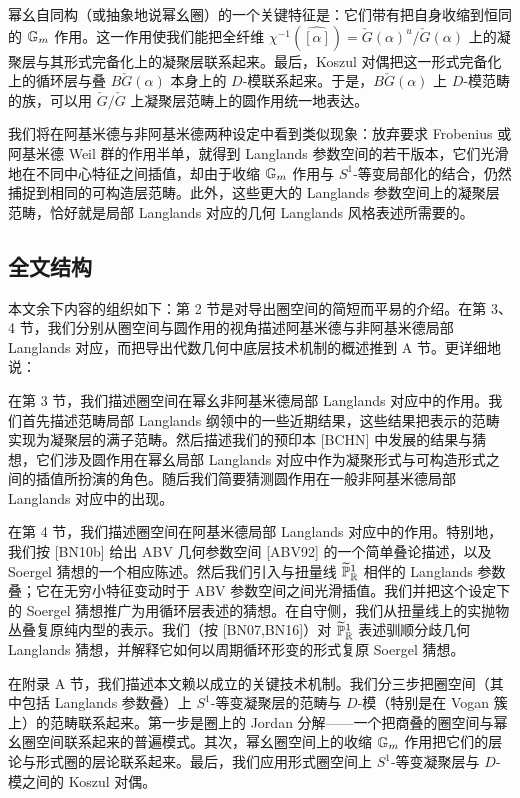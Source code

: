 幂幺自同构（或抽象地说幂幺圈）的一个关键特征是：它们带有把自身收缩到恒同的 $\mathbb{G}_m$ 作用。这一作用使我们能把全纤维 $\chi^{-1}(\widehat{[\alpha]})=\check G(\alpha)^u/\check G(\alpha)$ 上的凝聚层与其形式完备化上的凝聚层联系起来。最后，Koszul 对偶把这一形式完备化上的循环层与叠 $B\check G(\alpha)$ 本身上的 $D$-模联系起来。于是，$B\check G(\alpha)$ 上 $D$-模范畴的族，可以用 $\check G/\check G$ 上凝聚层范畴上的圆作用统一地表达。

我们将在阿基米德与非阿基米德两种设定中看到类似现象：放弃要求 Frobenius 或阿基米德 Weil 群的作用半单，就得到 Langlands 参数空间的若干版本，它们光滑地在不同中心特征之间插值，却由于收缩 $\mathbb{G}_m$ 作用与 $S^1$-等变局部化的结合，仍然捕捉到相同的可构造层范畴。此外，这些更大的 Langlands 参数空间上的凝聚层范畴，恰好就是局部 Langlands 对应的几何 Langlands 风格表述所需要的。

\subsection{全文结构}

本文余下内容的组织如下：第 2 节是对导出圈空间的简短而平易的介绍。在第 3、4 节，我们分别从圈空间与圆作用的视角描述阿基米德与非阿基米德局部 Langlands 对应，而把导出代数几何中底层技术机制的概述推到 A 节。更详细地说：

在第 3 节，我们描述圈空间在幂幺非阿基米德局部 Langlands 对应中的作用。我们首先描述范畴局部 Langlands 纲领中的一些近期结果，这些结果把表示的范畴实现为凝聚层的满子范畴。然后描述我们的预印本 [BCHN] 中发展的结果与猜想，它们涉及圆作用在幂幺局部 Langlands 对应中作为凝聚形式与可构造形式之间的插值所扮演的角色。随后我们简要猜测圆作用在一般非阿基米德局部 Langlands 对应中的出现。

在第 4 节，我们描述圈空间在阿基米德局部 Langlands 对应中的作用。特别地，我们按 [BN10b] 给出 ABV 几何参数空间 [ABV92] 的一个简单叠论描述，以及 Soergel 猜想的一个相应陈述。然后我们引入与扭量线 $\widetilde{\mathbb P}^1_{\mathbb{R}}$ 相伴的 Langlands 参数叠；它在无穷小特征变动时于 ABV 参数空间之间光滑插值。我们并把这个设定下的 Soergel 猜想推广为用循环层表述的猜想。在自守侧，我们从扭量线上的实抛物丛叠复原纯内型的表示。我们（按 [BN07,BN16]）对 $\widetilde{\mathbb P}^1_{\mathbb{R}}$ 表述驯顺分歧几何 Langlands 猜想，并解释它如何以周期循环形变的形式复原 Soergel 猜想。

在附录 A 节，我们描述本文赖以成立的关键技术机制。我们分三步把圈空间（其中包括 Langlands 参数叠）上 $S^1$-等变凝聚层的范畴与 $D$-模（特别是在 Vogan 簇上）的范畴联系起来。第一步是圈上的 Jordan 分解——一个把商叠的圈空间与幂幺圈空间联系起来的普遍模式。其次，幂幺圈空间上的收缩 $\mathbb{G}_m$ 作用把它们的层论与形式圈的层论联系起来。最后，我们应用形式圈空间上 $S^1$-等变凝聚层与 $D$-模之间的 Koszul 对偶。

